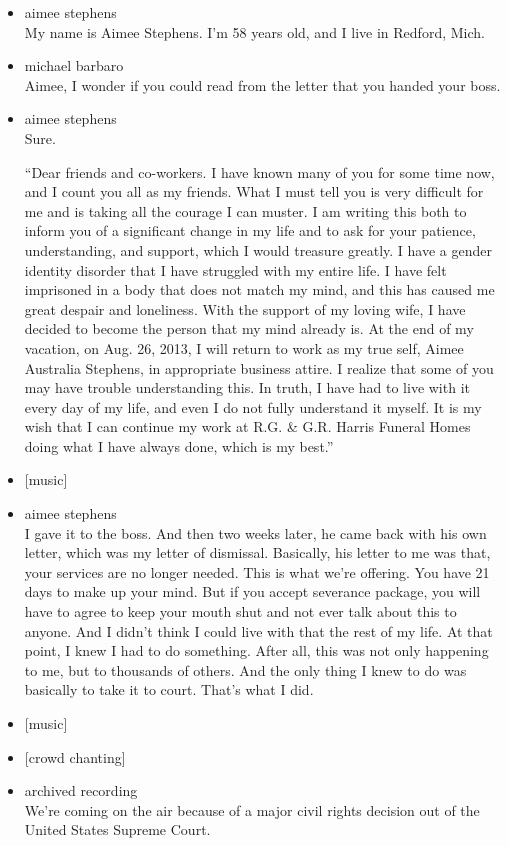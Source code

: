 \begin{itemize}
\item
  aimee stephens\\
  My name is Aimee Stephens. I'm 58 years old, and I live in Redford,
  Mich.
\item
  michael barbaro\\
  Aimee, I wonder if you could read from the letter that you handed your
  boss.
\item
  aimee stephens\\
  Sure.

  ``Dear friends and co-workers. I have known many of you for some time
  now, and I count you all as my friends. What I must tell you is very
  difficult for me and is taking all the courage I can muster. I am
  writing this both to inform you of a significant change in my life and
  to ask for your patience, understanding, and support, which I would
  treasure greatly. I have a gender identity disorder that I have
  struggled with my entire life. I have felt imprisoned in a body that
  does not match my mind, and this has caused me great despair and
  loneliness. With the support of my loving wife, I have decided to
  become the person that my mind already is. At the end of my vacation,
  on Aug. 26, 2013, I will return to work as my true self, Aimee
  Australia Stephens, in appropriate business attire. I realize that
  some of you may have trouble understanding this. In truth, I have had
  to live with it every day of my life, and even I do not fully
  understand it myself. It is my wish that I can continue my work at
  R.G. \& G.R. Harris Funeral Homes doing what I have always done, which
  is my best.''
\item
  {[}music{]}
\item
  aimee stephens\\
  I gave it to the boss. And then two weeks later, he came back with his
  own letter, which was my letter of dismissal. Basically, his letter to
  me was that, your services are no longer needed. This is what we're
  offering. You have 21 days to make up your mind. But if you accept
  severance package, you will have to agree to keep your mouth shut and
  not ever talk about this to anyone. And I didn't think I could live
  with that the rest of my life. At that point, I knew I had to do
  something. After all, this was not only happening to me, but to
  thousands of others. And the only thing I knew to do was basically to
  take it to court. That's what I did.
\item
  {[}music{]}
\item
  {[}crowd chanting{]}
\item
  archived recording\\
  We're coming on the air because of a major civil rights decision out
  of the United States Supreme Court.
\end{itemize}

